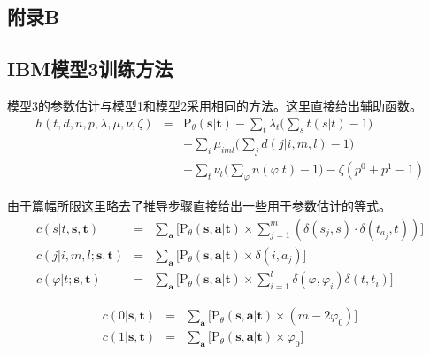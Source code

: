\begin{appendices}
\chapter{附录B}
\label{appendix-B}


\section{IBM模型3训练方法}
\parinterval 模型3的参数估计与模型1和模型2采用相同的方法。这里直接给出辅助函数。
\begin{eqnarray}
h(t,d,n,p, \lambda,\mu, \nu, \zeta) & = &  \textrm{P}_{\theta}(\mathbf{s}|\mathbf{t})-\sum_{t}\lambda_{t}\big(\sum_{s}t(s|t)-1\big)  \nonumber \\
& & -\sum_{i}\mu_{iml}\big(\sum_{j}d(j|i,m,l)-1\big) \nonumber \\
& & -\sum_{t}\nu_{t}\big(\sum_{\varphi}n(\varphi|t)-1\big)-\zeta(p^0+p^1-1)
\label{eq:1.1}
\end{eqnarray}

\parinterval 由于篇幅所限这里略去了推导步骤直接给出一些用于参数估计的等式。
\begin{eqnarray}
c(s|t,\mathbf{s},\mathbf{t}) & = & \sum_{\mathbf{a}}\big[\textrm{P}_{\theta}(\mathbf{s},\mathbf{a}|\mathbf{t}) \times \sum_{j=1}^{m} (\delta(s_j,s) \cdot \delta(t_{a_{j}},t))\big] \label{eq:1.2} \\
c(j|i,m,l;\mathbf{s},\mathbf{t}) & = & \sum_{\mathbf{a}}\big[\textrm{P}_{\theta}(\mathbf{s},\mathbf{a}|\mathbf{t}) \times \delta(i,a_j)\big] \label{eq:1.3} \\
c(\varphi|t;\mathbf{s},\mathbf{t}) & = & \sum_{\mathbf{a}}\big[\textrm{P}_{\theta}(\mathbf{s},\mathbf{a}|\mathbf{t}) \times \sum_{i=1}^{l}\delta(\varphi,\varphi_{i})\delta(t,t_i)\big]
\label{eq:1.4}
\end{eqnarray}

\begin{eqnarray}
c(0|\mathbf{s},\mathbf{t}) & = & \sum_{\mathbf{a}}\big[\textrm{P}_{\theta}(\mathbf{s},\mathbf{a}|\mathbf{t})  \times (m-2\varphi_0) \big] \label{eq:1.5} \\
c(1|\mathbf{s},\mathbf{t}) & = & \sum_{\mathbf{a}}\big[\textrm{P}_{\theta}(\mathbf{s},\mathbf{a}|\mathbf{t}) \times \varphi_0 \big] \label{eq:1.6}
\end{eqnarray}


\end{appendices}
